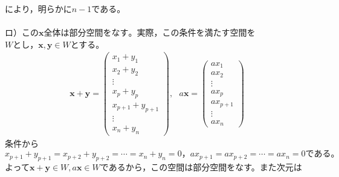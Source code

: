 \documentclass[dvipdfmx,uplatex,11pt]{jsarticle}
\begin{document}
により，明らかに$n-1$である。\\
\dotfill \\
ロ）この$\bm{x}全体は部分空間をなす。$実際，この条件を満たす空間を$Wとし，\bm{x,y} \in W$とする。
\begin{eqnarray*}
\bm{x}+\bm{y}=
\begin{pmatrix}
x_1+y_1 \\
x_2+y_2 \\
\vdots \\
x_{p}+y_{p} \\
x_{p+1}+y_{p+1} \\
\vdots \\
x_n+y_n
\end{pmatrix}
,~~~
a\bm{x}=
\begin{pmatrix}
ax_1 \\
ax_2 \\
\vdots \\
ax_{p} \\
ax_{p+1} \\
\vdots \\
ax_n
\end{pmatrix}
\end{eqnarray*}
条件から$x_{p+1}+y_{p+1}=x_{p+2}+y_{p+2}=\cdots =x_{n}+y_{n}=0，ax_{p+1}=ax_{p+2}=\cdots =ax_n=0である。$\\
よって$\bm{x}+\bm{y} \in W, a\bm{x} \in W$であるから，この空間は部分空間をなす。また次元は
\end{document}
